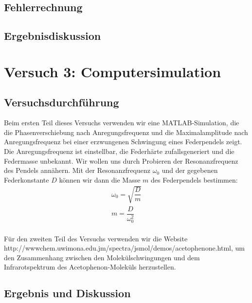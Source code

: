 \documentclass{scrartcl}
\begin{document}
\subsection{Fehlerrechnung}

\subsection{Ergebnisdiskussion}



\section{Versuch 3: Computersimulation}
\subsection{Versuchsdurchführung}
Beim ersten Teil dieses Versuchs verwenden wir eine MATLAB-Simulation, die die Phasenverschiebung nach Anregungsfrequenz und die Maximalamplitude nach Anregungsfrequenz bei einer erzwungenen Schwingung eines Federpendels zeigt. Die Anregungsfrequenz ist einstellbar, die Federhärte zufallsgeneriert und die Federmasse unbekannt. Wir wollen uns durch Probieren der Resonanzfrequenz des Pendels annähern. Mit der Resonanzfrequenz $\omega_{0}$ und der gegebenen Federkonstante $D$ können wir dann die Masse $m$ des Federpendels bestimmen:
\begin{align*}
\omega_{0} = \sqrt{\dfrac{D}{m}} \\
m = \dfrac{D}{\omega_{0}^2}
\end{align*}
\\
Für den zweiten Teil des Versuchs verwenden wir die Website \\http://wwwchem.uwimona.edu.jm/spectra/jsmol/demos/acetophenone.html, um den Zusammenhang zwischen den Molekülschwingungen und dem Infrarotspektrum des Acetophenon-Moleküls herzustellen.
\subsection{Ergebnis und Diskussion}
\end{document}
